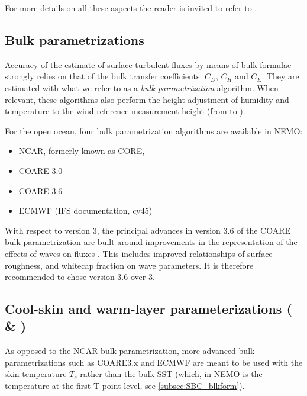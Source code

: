 \documentclass[../main/NEMO_manual]{subfiles}
\begin{document}
For more details on all these aspects the reader is invited to refer
to \citet{brodeau.barnier.ea_JPO16}.

\subsection{Bulk parametrizations}
\label{subsec:SBC_blk_ocean}

Accuracy of the estimate of surface turbulent fluxes by means of bulk formulae
strongly relies on that of the bulk transfer coefficients: $C_D$, $C_H$ and
$C_E$. They are estimated with what we refer to as a \emph{bulk
parametrization} algorithm. When relevant, these algorithms also perform the
height adjustment of humidity and temperature to the wind reference measurement
height (from  to ).

For the open ocean, four bulk parametrization algorithms are available in NEMO:

\begin{itemize}
\item NCAR, formerly known as CORE, \citep{large.yeager_trpt04,large.yeager_CD09}
\item COARE 3.0 \citep{fairall.bradley.ea_JC03}
\item COARE 3.6 \citep{edson.jampana.ea_JPO13}
\item ECMWF (IFS documentation, cy45)
\end{itemize}

With respect to version 3, the principal advances in version 3.6 of the COARE
bulk parametrization are built around improvements in the representation of the
effects of waves on
fluxes \citep{edson.jampana.ea_JPO13,brodeau.barnier.ea_JPO16}. This includes
improved relationships of surface roughness, and whitecap fraction on wave
parameters. It is therefore recommended to chose version 3.6 over 3.

\subsection[Cool-skin and warm-layer parameterizations (   \forcode{ln_skin_cs}               \& \forcode{ln_skin_wl}              )]
           {Cool-skin and warm-layer parameterizations (\protect{} \&      )}
\label{subsec:SBC_skin}

As opposed to the NCAR bulk parametrization, more advanced bulk
parametrizations such as COARE3.x and ECMWF are meant to be used with the skin
temperature $T_s$ rather than the bulk SST (which, in NEMO is the temperature at
the first T-point level, see \autoref{subsec:SBC_blkform}).
\end{document}
